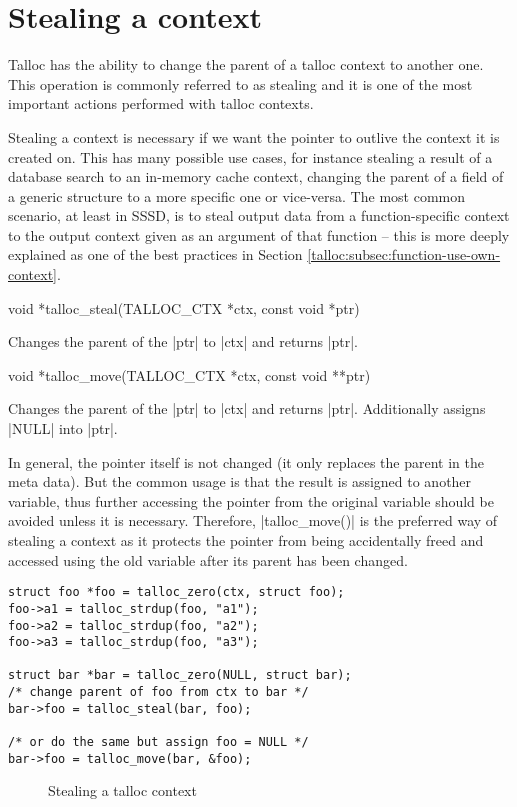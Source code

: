 \section{Stealing a context}
\label{talloc:stealing}

Talloc has the ability to change the parent of a talloc context to another
one. This operation is commonly referred to as stealing and it is one of
the most important actions performed with talloc contexts.

Stealing a context is necessary if we want the pointer to outlive the context it
is created on. This has many possible use cases, for instance stealing a result
of a database search to an in-memory cache context, changing the parent of a
field of a generic structure to a more specific one or vice-versa. The most
common scenario, at least in SSSD, is to steal output data from a function-specific
context to the output context given as an argument of that function -- this is
more deeply explained as one of the best practices in Section 
\ref{talloc:subsec:function-use-own-context}.

\begin{funcproto}
void *talloc_steal(TALLOC_CTX *ctx, const void *ptr)
\end{funcproto}
\begin{funcdesc}
  Changes the parent of the |ptr| to |ctx| and returns |ptr|.
\end{funcdesc}
\begin{funcproto}
void *talloc_move(TALLOC_CTX *ctx, const void **ptr)
\end{funcproto}
\begin{funcdesc}
  Changes the parent of the |ptr| to |ctx| and returns |ptr|.
  Additionally assigns |NULL| into |ptr|.
\end{funcdesc}
\funclistend
In general, the pointer itself is not changed (it only replaces the
parent in the meta data). But the common usage is that the result is assigned
to another variable, thus further accessing the pointer from the original
variable should be avoided unless it is necessary. Therefore, |talloc_move()| is
the preferred way of stealing a context as it protects the pointer from being
accidentally freed and accessed using the old variable after its parent has
been changed.

\begin{lstlisting}[caption={talloc_steal() and talloc_move()}]
struct foo *foo = talloc_zero(ctx, struct foo);
foo->a1 = talloc_strdup(foo, "a1");
foo->a2 = talloc_strdup(foo, "a2");
foo->a3 = talloc_strdup(foo, "a3");

struct bar *bar = talloc_zero(NULL, struct bar);
/* change parent of foo from ctx to bar */
bar->foo = talloc_steal(bar, foo);

/* or do the same but assign foo = NULL */
bar->foo = talloc_move(bar, &foo);
\end{lstlisting}

\begin{figure}[H]
  \centering
  
  \caption{Stealing a talloc context}
  \label{fig:steal}
\end{figure}
